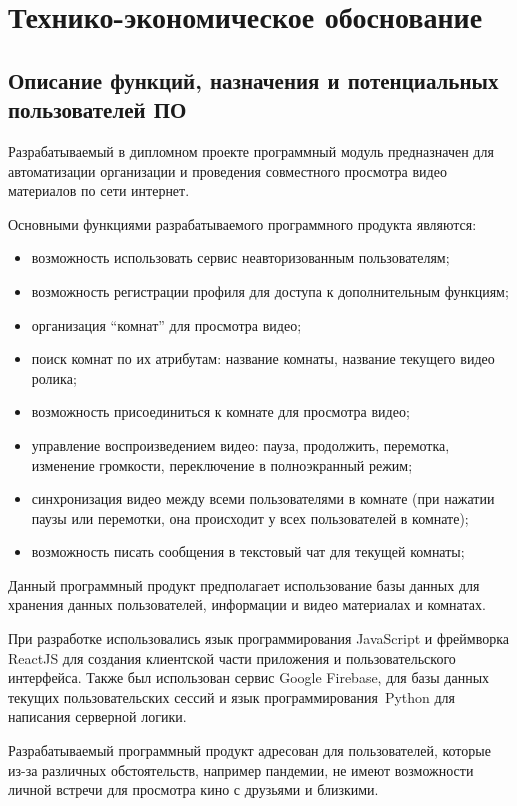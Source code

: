 \newcommand{\byr}{Br}
\section{Технико-экономическое обоснование}
 
\subsection{Описание функций, назначения и потенциальных пользователей ПО}
Разрабатываемый в дипломном проекте программный модуль предназначен для автоматизации организации и проведения совместного просмотра видео материалов по сети интернет.
 
Основными функциями разрабатываемого программного продукта являются:
\begin{itemize}
 \item возможность использовать сервис неавторизованным пользователям;
 \item возможность регистрации профиля для доступа к дополнительным функциям;
 \item организация “комнат” для просмотра видео;
 \item поиск комнат по их атрибутам: название комнаты, название текущего видео ролика;
 \item возможность присоединиться к комнате для просмотра видео;
 \item управление воспроизведением видео: пауза, продолжить, перемотка, изменение громкости, переключение в полноэкранный режим;
 \item синхронизация видео между всеми пользователями в комнате (при нажатии паузы или перемотки, она происходит у всех пользователей в комнате);
 \item возможность писать сообщения в текстовый чат для текущей комнаты;
\end{itemize}
 
Данный программный продукт предполагает использование базы данных для хранения данных пользователей, информации и видео материалах и комнатах.
 
При разработке использовались язык программирования JavaScript и фреймворка ReactJS для создания клиентской части приложения и пользовательского интерфейса. Также был использован сервис Google Firebase, для базы данных текущих пользовательских сессий и язык программирования\linebreak~Python для написания серверной логики.
 
Разрабатываемый программный продукт адресован для пользователей, которые из-за различных обстоятельств, например пандемии, не имеют возможности личной встречи для просмотра кино с друзьями и близкими.
 
